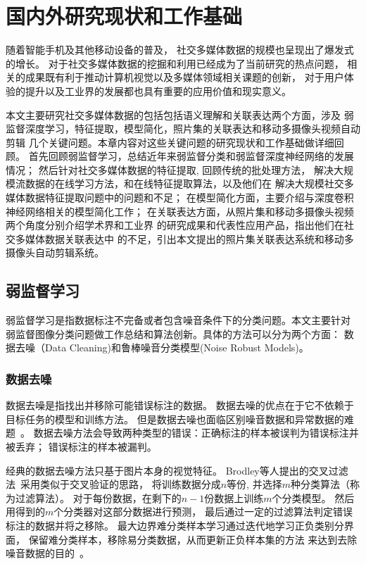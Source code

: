 \chapter{国内外研究现状和工作基础}
随着智能手机及其他移动设备的普及，
社交多媒体数据的规模也呈现出了爆发式的增长。
对于社交多媒体数据的挖掘和利用已经成为了当前研究的热点问题，
相关的成果既有利于推动计算机视觉以及多媒体领域相关课题的创新，
对于用户体验的提升以及工业界的发展都也具有重要的应用价值和现实意义。

本文主要研究社交多媒体数据的包括包括语义理解和关联表达两个方面，涉及
弱监督深度学习，特征提取，模型简化，照片集的关联表达和移动多摄像头视频自动剪辑
几个关键问题。本章内容对这些关键问题的研究现状和工作基础做详细回顾。
首先回顾弱监督学习，总结近年来弱监督分类和弱监督深度神经网络的发展情况；
然后针对社交多媒体数据的特征提取, 回顾传统的批处理方法，
解决大规模流数据的在线学习方法，和在线特征提取算法，以及他们在
解决大规模社交多媒体数据特征提取问题中的问题和不足；
在模型简化方面，主要介绍与深度卷积神经网络相关的模型简化工作；
在关联表达方面，从照片集和移动多摄像头视频两个角度分别介绍学术界和工业界
的研究成果和代表性应用产品，指出他们在社交多媒体数据关联表达中
的不足，引出本文提出的照片集关联表达系统和移动多摄像头自动剪辑系统。

\section{弱监督学习}
弱监督学习是指数据标注不完备或者包含噪音条件下的分类问题。本文主要针对
弱监督图像分类问题做工作总结和算法创新。具体的方法可以分为两个方面：
数据去噪（Data Cleaning)和鲁棒噪音分类模型(Noise Robust Models)。

\subsection{数据去噪}
\label{sec:data-cleaning}
数据去噪是指找出并移除可能错误标注的数据。
数据去噪的优点在于它不依赖于目标任务的模型和训练方法。
但是数据去噪也面临区别噪音数据和异常数据的难题~\cite{danyluk2014small}。
数据去噪方法会导致两种类型的错误：正确标注的样本被误判为错误标注并被丢弃；
错误标注的样本被漏判。

经典的数据去噪方法只基于图片本身的视觉特征。
Brodley等人提出的交叉过滤法~\cite{brodley1999identifying}采用类似于交叉验证的思路，
将训练数据分成$n$等份, 并选择$m$种分类算法（称为过滤算法）。
对于每份数据，在剩下的$n-1$份数据上训练$m$个分类模型。
然后用得到的$m$个分类器对这部分数据进行预测，
最后通过一定的过滤算法判定错误标注的数据并将之移除。
最大边界难分类样本学习通过迭代地学习正负类别分界面，
保留难分类样本，移除易分类数据，从而更新正负样本集的方法
来达到去除噪音数据的目的~\cite{zhou2015conceptlearner}。

